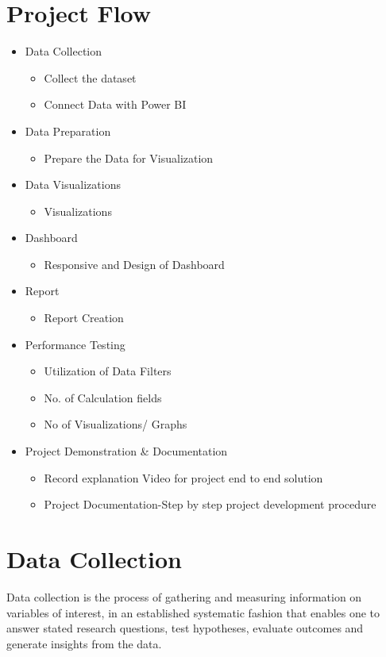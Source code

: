 \documentclass{article}
\begin{document}
\section{Project Flow}
\begin{itemize}
    \item Data Collection
    \begin{itemize}
        \item Collect the dataset
        \item Connect Data with Power BI
    \end{itemize}
    \item Data Preparation
    \begin{itemize}
        \item Prepare the Data for Visualization
    \end{itemize}
    \item Data Visualizations
    \begin{itemize}
        \item Visualizations
    \end{itemize}
    \item Dashboard
    \begin{itemize}
        \item Responsive and Design of Dashboard
    \end{itemize}
    \item Report
    \begin{itemize}
        \item Report Creation
    \end{itemize}
    \item Performance Testing 
    \begin{itemize}
        \item Utilization of Data Filters
        \item No. of Calculation fields
        \item No of Visualizations/ Graphs 
    \end{itemize}
    \item Project Demonstration \& Documentation
    \begin{itemize}
        \item Record explanation Video for project end to end solution
        \item Project Documentation-Step by step project development procedure
    \end{itemize}
\end{itemize}

\section{Data Collection}
Data collection is the process of gathering and measuring information on variables of interest, in an established systematic fashion that enables one to answer stated research questions, test hypotheses, evaluate outcomes and generate insights from the data.
\end{document}
